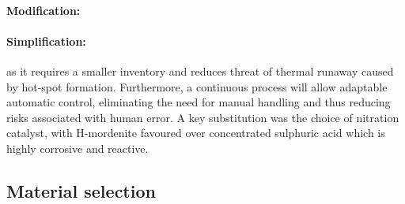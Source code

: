 \paragraph{Modification:}


\paragraph{Simplification:} 


 as it requires a smaller inventory and reduces threat of thermal runaway caused by hot-spot formation. Furthermore, a continuous process will allow adaptable automatic control, eliminating the need for manual handling and thus reducing risks associated with human error.  A key substitution was the choice of nitration catalyst, with H-mordenite favoured over concentrated sulphuric acid which is highly corrosive and reactive.  




\subsection{Material selection}